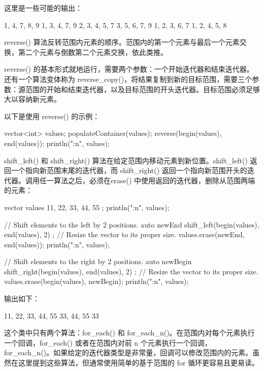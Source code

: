 这里是一些可能的输出：

\begin{shell}
1, 4, 7, 8, 9
1, 3, 4, 7, 9
2, 3, 4, 5, 7
3, 5, 6, 7, 9
1, 2, 3, 6, 7
1, 2, 4, 5, 8
\end{shell}


reverse() 算法反转范围内元素的顺序。范围内的第一个元素与最后一个元素交换，第二个元素与倒数第二个元素交换，依此类推。

reverse() 的基本形式就地运行，需要两个参数：一个开始迭代器和结束迭代器。还有一个算法变体称为 reverse\_copy()，将结果复制到新的目标范围，需要三个参数：源范围的开始和结束迭代器，以及目标范围的开头迭代器。目标范围必须足够大以容纳新元素。

以下是使用 reverse() 的示例：

\begin{cpp}
vector<int> values;
populateContainer(values);
reverse(begin(values), end(values));
println("{:n}", values);
\end{cpp}


shift\_left() 和 shift\_right() 算法在给定范围内移动元素到新位置。shift\_left() 返回一个指向新范围末尾的迭代器，而 shift\_right() 返回一个指向新范围开头的迭代器。调用任一算法之后，必须在erase() 中使用返回的迭代器，删除从范围两端的元素：

\begin{cpp}
vector values { 11, 22, 33, 44, 55 };
println("{:n}", values);

// Shift elements to the left by 2 positions.
auto newEnd { shift_left(begin(values), end(values), 2) };
// Resize the vector to its proper size.
values.erase(newEnd, end(values));
println("{:n}", values);

// Shift elements to the right by 2 positions.
auto newBegin { shift_right(begin(values), end(values), 2) };
// Resize the vector to its proper size.
values.erase(begin(values), newBegin);
println("{:n}", values);
\end{cpp}

输出如下：

\begin{shell}
11, 22, 33, 44, 55
33, 44, 55
33
\end{shell}


这个类中只有两个算法：for\_each() 和 for\_each\_n()。在范围内对每个元素执行一个回调，for\_each() 或者在范围内对前 n 个元素执行一个回调，for\_each\_n()。如果给定的迭代器类型是非常量，回调可以修改范围内的元素。虽然在这里提到这些算法，但通常使用简单的基于范围的 for 循环更容易且更易读。

